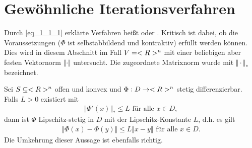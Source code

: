 \section{Gewöhnliche Iterationsverfahren}

Durch \ref{eq_1_1_1} erklärte Verfahren heißt  oder . Kritisch ist dabei, ob die Voraussetzungen ($\Phi$ ist selbstabbildend und kontraktiv) erfüllt werden können. Dies wird in diesem Abschnitt im Fall $V = <R>^n$ mit einer beliebigen aber festen Vektornorm $\Vert \cdot \Vert$ untersucht. Die zugeordnete Matrixnorm wurde mit $\Vert \cdot \Vert_{\ast}$ bezeichnet.

\begin{lemma}
	Sei $S \subseteq <R>^n$ offen und konvex und $\Phi: D \to <R>^n$ stetig differenzierbar. Falls $L > 0$ existiert mit
	\begin{align}
	\Vert \Phi'(x) \Vert_{\ast} \le L \text{ für alle } x \in D, \label{eq_1_1_5}
	\end{align}
	dann ist $\Phi$ Lipschitz-stetig in $D$ mit der Lipschitz-Konstante $L$, d.h. es gilt
	\begin{align}
	\Vert \Phi(x) - \Phi(y)\Vert \le L \Vert x-y \Vert \text{ für alle } x \in D. \label{eq_1_1_6}
	\end{align}
	Die Umkehrung dieser Aussage ist ebenfalls richtig.
\end{lemma}

